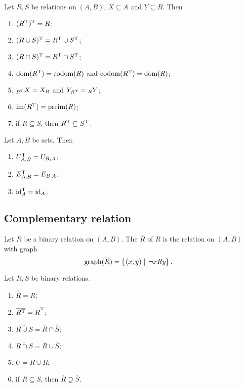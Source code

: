 \begin{lemma}
Let $R,S$ be relations on $(A, B)$, $X\subseteq A$ and $Y\subseteq B$. Then
\begin{enumerate}
\item $(R^{\mathrm{T}})^{\mathrm{T}} = R$;
\item $(R \cup S)^{\mathrm{T}} = R^{\mathrm{T}} \cup S^{\mathrm{T}}$;
\item $(R \cap S)^{\mathrm{T}} = R^{\mathrm{T}} \cap S^{\mathrm{T}}$;
\item $\operatorname{dom}(R^{\mathrm{T}}) = \operatorname{codom}(R)$ and $\operatorname{codom}(R^{\mathrm{T}}) = \operatorname{dom}(R)$;
\item $_{R^{\mathrm{T}}}X = X_R$ and $Y_{R^{\mathrm{T}}} = {_RY}$;
\item $\operatorname{im}(R^{\mathrm{T}}) = \operatorname{preim}(R)$;
\item if $R\subseteq S$, then $R^{\mathrm{T}} \subseteq S^{\mathrm{T}}$.
\end{enumerate}
\end{lemma}

\begin{lemma}
Let $A,B$ be sets. Then
\begin{enumerate}
\item $U_{A,B}^{\mathrm{T}} = U_{B,A}$;
\item $E_{A,B}^{\mathrm{T}} = E_{B,A}$;
\item $\operatorname{id}_A^{\mathrm{T}} = \operatorname{id}_A$.
\end{enumerate}
\end{lemma}

\subsection{Complementary relation}
\begin{definition}
Let $R$ be a binary relation on $(A, B)$. The  $\overline{R}$ of $R$ is the relation on $(A, B)$ with graph
\[ \operatorname{graph}(\overline{R}) = \left\{\left. (x,y) \;\right|\; \neg xRy \right\}. \]
\end{definition}
\begin{lemma} \label{relationalComplementProperties}
Let $R,S$ be binary relations.
\begin{enumerate}
\item $\overline{\overline{R}} = R$;
\item $\overline{R^{\mathrm{T}}} = \overline{R}^{\mathrm{T}}$;
\item $\overline{R\cup S} = \overline{R}\cap \overline{S}$;
\item $\overline{R\cap S} = \overline{R}\cup \overline{S}$;
\item $U = R \cup \overline{R}$;
\item if $R \subseteq S$, then $\overline{R} \supseteq \overline{S}$.
\end{enumerate}
\end{lemma}

